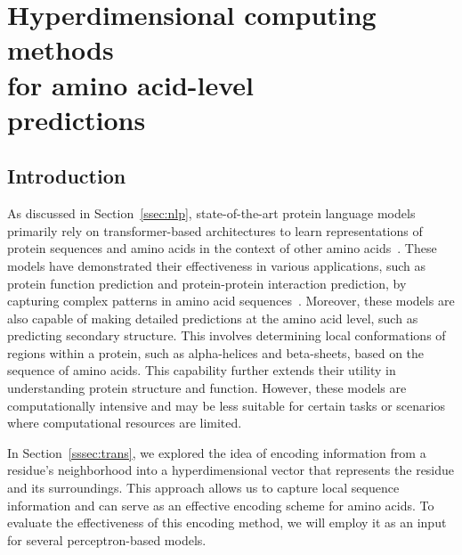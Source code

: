 \chapter[Hyperdimensional computing methods for amino acid-level predictions]{Hyperdimensional computing methods\\for amino acid-level\\predictions}
\section{Introduction}
As discussed in Section~\ref{ssec:nlp}, state-of-the-art protein language models primarily rely on transformer-based architectures to learn representations of protein sequences and amino acids in the context of other amino acids~\cite{review}. These models have demonstrated their effectiveness in various applications, such as protein function prediction and protein-protein interaction prediction, by capturing complex patterns in amino acid sequences~\cite{esm2}. Moreover, these models are also capable of making detailed predictions at the amino acid level, such as predicting secondary structure. This involves determining local conformations of regions within a protein, such as alpha-helices and beta-sheets, based on the sequence of amino acids. This capability further extends their utility in understanding protein structure and function. However, these models are computationally intensive and may be less suitable for certain tasks or scenarios where computational resources are limited.

In Section~\ref{sssec:trans}, we explored the idea of encoding information from a residue's neighborhood into a hyperdimensional vector that represents the residue and its surroundings. This approach allows us to capture local sequence information and can serve as an effective encoding scheme for amino acids. To evaluate the effectiveness of this encoding method, we will employ it as an input for several perceptron-based models.

